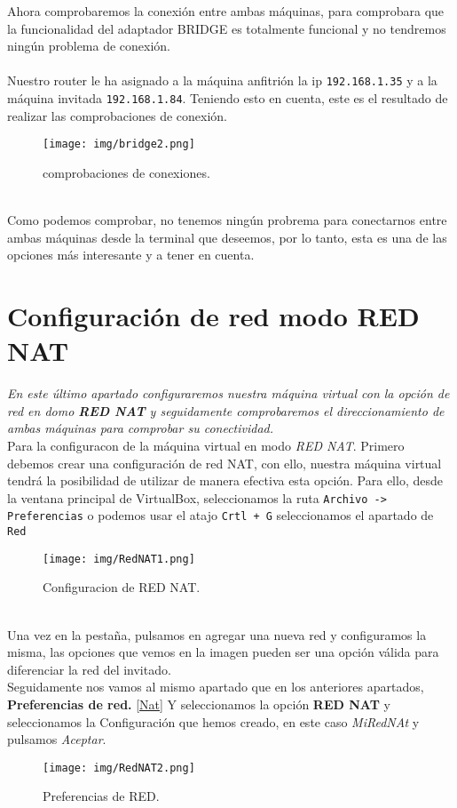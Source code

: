 \documentclass[12pt]{article}
\begin{document}
      \newpage

      Ahora comprobaremos la conexión entre ambas máquinas, para comprobara que la funcionalidad del adaptador BRIDGE es totalmente funcional 
      y no tendremos ningún problema de conexión.
      \\\\
      Nuestro router le ha asignado a la máquina anfitrión la ip \texttt{192.168.1.35} y a la máquina invitada \texttt{192.168.1.84}. Teniendo 
      esto en cuenta, este es el resultado de realizar las comprobaciones de conexión.
      \begin{figure}[h]
        \centering
        \texttt{[image: img/bridge2.png]}
        \caption{comprobaciones de conexiones.}
        \label{Bridge2}
      \end{figure}
      \\
      Como podemos comprobar, no tenemos ningún probrema para conectarnos entre ambas máquinas desde la terminal que deseemos, por lo tanto, esta 
      es una de las opciones más interesante y a tener en cuenta.

      \newpage

    \section{Configuración de red modo RED NAT}
      \textit{En este último apartado configuraremos nuestra máquina virtual con la opción de red en domo \textbf{RED NAT} y seguidamente comprobaremos el 
      direccionamiento de ambas máquinas para comprobar su conectividad.}
      \\
      Para la configuracon de la máquina virtual en modo \textit{RED NAT}. Primero debemos crear una configuración de red NAT, con ello, nuestra 
      máquina virtual tendrá la posibilidad de utilizar de manera efectiva esta opción. Para ello, desde la ventana principal de VirtualBox, seleccionamos 
      la ruta \texttt{Archivo -> Preferencias} o podemos usar el atajo \texttt{Crtl + G} seleccionamos el apartado de \texttt{Red} 
      \begin{figure}[h]
        \centering
        \texttt{[image: img/RedNAT1.png]}
        \caption{Configuracion de RED NAT.}
        \label{RedNAT1}
      \end{figure}
      \\
      Una vez en la pestaña, pulsamos en agregar una nueva red y configuramos la misma, las opciones que vemos en la imagen pueden ser una opción válida para 
      diferenciar la red del invitado.
      \\
      Seguidamente nos vamos al mismo apartado que en los anteriores apartados, \textbf{Preferencias de red.} \ref{Nat} Y seleccionamos la opción \textbf{RED NAT} 
      y seleccionamos la Configuración que hemos creado, en este caso \textit{MiRedNAt} y pulsamos \textit{Aceptar}.
      \begin{figure}[h]
        \centering
        \texttt{[image: img/RedNAT2.png]}
        \caption{Preferencias de RED.}
        \label{RedNAT2}
      \end{figure}
\end{document}
